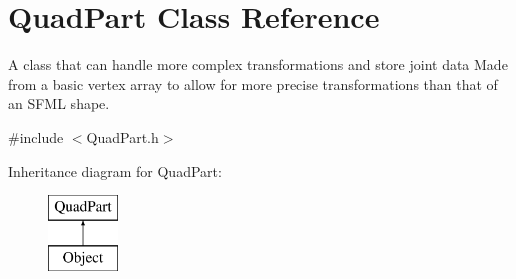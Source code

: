 \hypertarget{class_quad_part}{}\section{Quad\+Part Class Reference}
\label{class_quad_part}


A class that can handle more complex transformations and store joint data Made from a basic vertex array to allow for more precise transformations than that of an S\+F\+ML shape.  




{\ttfamily \#include $<$Quad\+Part.\+h$>$}

Inheritance diagram for Quad\+Part\+:\begin{figure}[H]
\begin{center}
\leavevmode
\includegraphics[height=2.000000cm]{class_quad_part}
\end{center}
\end{figure}
